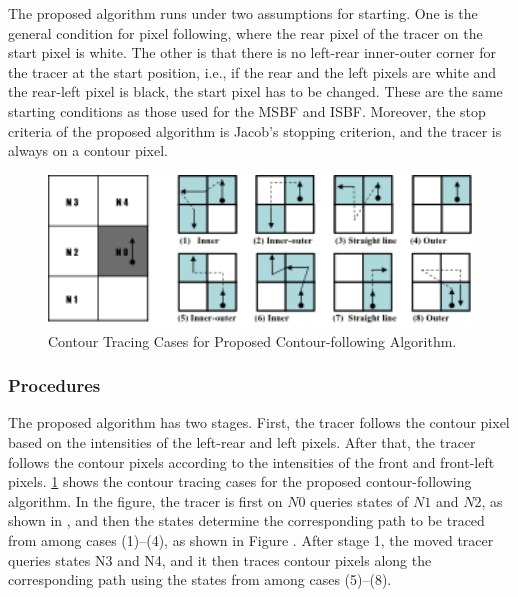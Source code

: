 The proposed algorithm runs under two assumptions for starting. One is the general condition for pixel following, where the rear pixel of the tracer on the start pixel is white. The other is that there is no left-rear inner-outer corner for the tracer at the start position, i.e., if the rear and the left pixels are white and the rear-left pixel is black, the start pixel has to be changed. These are the same starting conditions as those used for the MSBF and ISBF. Moreover, the stop criteria of the proposed algorithm is Jacob’s stopping criterion, and the tracer is always on a contour pixel. 

\begin{figure}[htbp]
	\centering
	\includegraphics[width=1.0\textwidth]{4.Proposed/proposed_cases.png}
	\caption{Contour Tracing Cases for Proposed Contour-following Algorithm.}
	\label{fig:image9}
\end{figure}


\subsubsection{Procedures}


The proposed algorithm has two stages. First, the tracer follows the contour pixel based on the intensities of the left-rear and left pixels. After that, the tracer follows the contour pixels according to the intensities of the front and front-left pixels.  \ref{fig:image9} shows the contour tracing cases for the proposed contour-following algorithm. In the figure, the tracer is first on $N0$ queries states of $N1$ and $N2$, as shown in  , and then the states determine the corresponding path to be traced from among cases (1)–(4), as shown in Figure . After stage 1, the moved tracer queries states N3 and N4, and it then traces contour pixels along the corresponding path using the states from among cases (5)–(8). 

